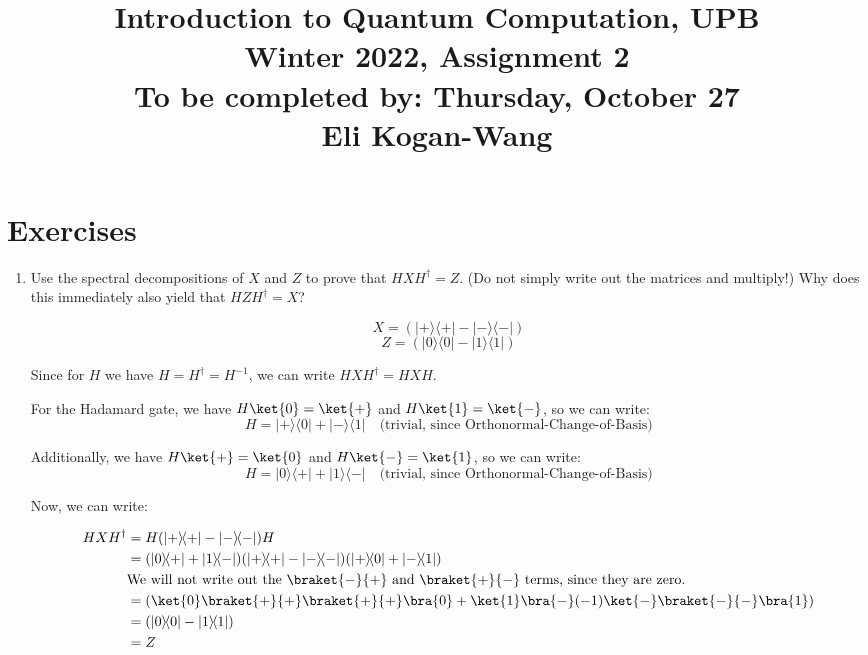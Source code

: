 \documentclass{article}
\newcommand{\ketbra}[2]{|#1\rangle\!\langle #2|}
\begin{document}
\title{\vspace{-10mm}Introduction to Quantum Computation, UPB\\Winter 2022, Assignment 2\\{\large To be completed by: Thursday, October 27}
\\Eli Kogan-Wang}
\date{}
\maketitle

\section{Exercises}
\begin{enumerate}
  \item %
        Use the spectral decompositions of $X$ and $Z$ to prove that $HXH^\dagger=Z$. (Do not simply write out the matrices and multiply!) Why does this immediately also yield that $HZH^\dagger=X$?

        $$X=(\ketbra{+}{+}-\ketbra{-}{-})$$
        $$Z=(\ketbra{0}{0}-\ketbra{1}{1})$$

        Since for $H$ we have $H=H^\dagger=H^{-1}$, we can write $HXH^\dagger=HXH$.

        For the Hadamard gate, we have $H\ket{0}=\ket{+}$ and $H\ket{1}=\ket{-}$, so we can write:
        $$H=\ketbra{+}{0}+\ketbra{-}{1}\quad\text{(trivial, since Orthonormal-Change-of-Basis)}$$

        Additionally, we have $H\ket{+}=\ket{0}$ and $H\ket{-}=\ket{1}$, so we can write:
        $$H=\ketbra{0}{+}+\ketbra{1}{-}\quad\text{(trivial, since Orthonormal-Change-of-Basis)}$$

        Now, we can write:

        $$\begin{aligned}
            HXH^\dagger & =H(\ketbra{+}{+}-\ketbra{-}{-})H                                                           \\
                        & = (\ketbra{0}{+}+\ketbra{1}{-})(\ketbra{+}{+}-\ketbra{-}{-})(\ketbra{+}{0}+\ketbra{-}{1})  \\
            \rlap{\text{We will not write out the $\braket{-}{+}$ and $\braket{+}{-}$ terms, since they are zero.}}  \\
                        & = (\ket{0}\braket{+}{+}\braket{+}{+}\bra{0}+\ket{1}\bra{-}(-1)\ket{-}\braket{-}{-}\bra{1}) \\
                        & = (\ketbra{0}{0}-\ketbra{1}{1})                                                            \\
                        & = Z
          \end{aligned}$$


\end{enumerate}
\end{document}
